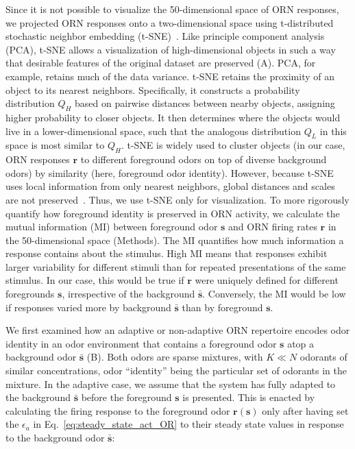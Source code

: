 \documentclass[9pt,lineno]{elife}
\begin{document}
Since it is not possible to visualize the 50-dimensional space of ORN responses, we projected ORN responses onto a two-dimensional space using t-distributed stochastic neighbor embedding (t-SNE)~\citep{tsne}. {\color{blue} Like principle component analysis (PCA), t-SNE allows a visualization of high-dimensional objects in such a way that desirable features of the original dataset are preserved  (A). PCA, for example, retains much of the data variance. t-SNE retains the proximity of an object to its nearest neighbors. Specifically, it constructs a probability distribution $Q_H$ based on pairwise distances between nearby objects, assigning higher probability to closer objects. It then determines where the objects would live in a lower-dimensional space, such that the analogous distribution $Q_L$ in this space is most similar to $Q_H$. t-SNE is widely used to cluster objects (in our case, ORN responses $\mathbf r$ to different foreground odors on top of diverse background odors) by similarity (here, foreground odor identity). However, because t-SNE uses local information from only nearest neighbors, global distances and scales are not preserved~\citep{globaltsne}. Thus, we use t-SNE only for visualization. To more rigorously quantify how foreground identity is preserved in ORN activity, we calculate the mutual information (MI) between foreground odor $\mathbf{s}$ and ORN firing rates $\mathbf r$ in the 50-dimensional space (Methods). The MI quantifies how much information a response contains about the stimulus. High MI means that responses exhibit larger variability for different stimuli than for repeated presentations of the same stimulus. In our case, this would be true if $\mathbf r$ were uniquely defined for different foregrounds $\mathbf s$, irrespective of the background $\bar{\mathbf{s}}$. Conversely, the MI would be low if responses varied more by background $\bar{\mathbf{s}}$ than by foreground $\mathbf s$. }

We first examined how an adaptive or non-adaptive ORN repertoire encodes odor identity in an odor environment that contains a foreground odor $\mathbf{s}$ atop a background odor $\bar{\mathbf{s}}$ (B). Both odors are sparse mixtures, with $K \ll N$ odorants of similar concentrations, odor ``identity'' being the particular set of odorants in the mixture. In the adaptive case, we assume that the system has fully adapted to the background $\bar{\mathbf{s}}$ before the foreground $\mathbf{s}$ is presented. This is enacted by calculating the firing response to the foreground odor $\mathbf{r}(\mathbf{s})$ only after having set the $\epsilon_a$ in Eq.~\ref{eq:steady_state_act_OR} to their steady state values in response to the background odor $\bar{\mathbf{s}}$: 
\end{document}
